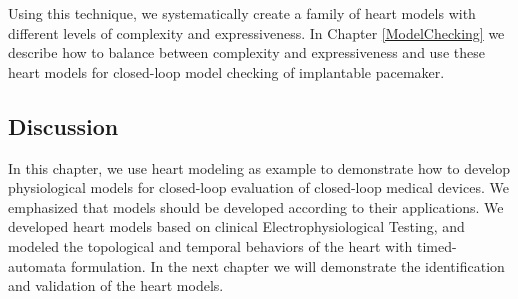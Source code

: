 Using this technique, we systematically create a family of heart models with different levels of complexity and expressiveness. In Chapter \ref{ModelChecking} we describe how to balance between complexity and expressiveness and use these heart models for closed-loop model checking of implantable pacemaker.

\subsection{Discussion}
In this chapter, we use heart modeling as example to demonstrate how to develop physiological models for closed-loop evaluation of closed-loop medical devices. We emphasized that models should be developed according to their applications. We developed heart models based on clinical Electrophysiological Testing, and modeled the topological and temporal behaviors of the heart with timed-automata formulation. In the next chapter we will demonstrate the identification and validation of the heart models.


